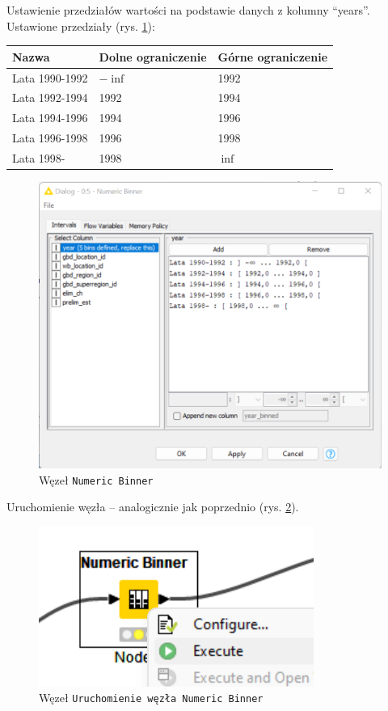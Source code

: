 \documentclass[11pt]{report}
\begin{document}
Ustawienie przedziałów wartości na podstawie danych z kolumny \enquote{years}. Ustawione przedziały (rys. \ref{fig:numeric_binner_2}):

\begin{tabular}{lll}
    Nazwa          & Dolne ograniczenie & Górne ograniczenie \\ \hline
    Lata 1990-1992 & $-\inf$            & 1992               \\
    Lata 1992-1994 & 1992               & 1994               \\
    Lata 1994-1996 & 1994               & 1996               \\
    Lata 1996-1998 & 1996               & 1998               \\
    Lata 1998-     & 1998               & $\inf$             \\
\end{tabular}

\begin{figure}[h]
    \centering
    \includegraphics[width=.8\textwidth]{numeric_binner_2.png}
    \caption{Węzeł \texttt{Numeric Binner}\label{fig:numeric_binner_2}}
\end{figure}

Uruchomienie węzła -- analogicznie jak poprzednio (rys. \ref{fig:numeric_binner_3}).

\begin{figure}[h]
    \centering
    \includegraphics[width=.4\textwidth]{numeric_binner_3.png}
    \caption{Węzeł \texttt{Uruchomienie węzła \texttt{Numeric Binner}}\label{fig:numeric_binner_3}}
\end{figure}
\end{document}

